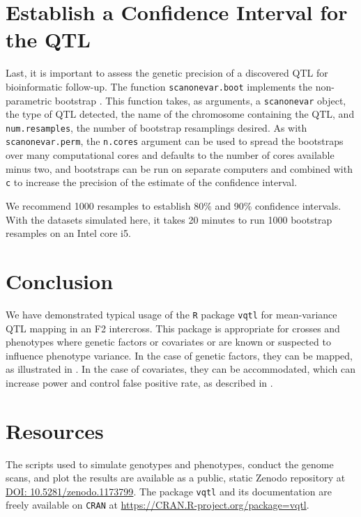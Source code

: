 \documentclass[9pt,twocolumn,twoside]{gsag3jnl}
\begin{document}
\section{Establish a Confidence Interval for the QTL}

Last, it is important to assess the genetic precision of a discovered QTL for bioinformatic follow-up.
The function \texttt{scanonevar.boot} implements the non-parametric bootstrap \citep{Visscher1996}.
This function takes, as arguments, a \texttt{scanonevar} object, the type of QTL detected, the name of the chromosome containing the QTL, and \texttt{num.resamples}, the number of bootstrap resamplings desired.
As with \texttt{scanonevar.perm}, the \texttt{n.cores} argument can be used to spread the bootstraps over many computational cores and defaults to the number of cores available minus two, and bootstraps can be run on separate computers and combined with \texttt{c} to increase the precision of the estimate of the confidence interval.

We recommend 1000 resamples to establish 80\% and 90\% confidence intervals.
With the datasets simulated here, it takes 20 minutes to run 1000 bootstrap resamples on an Intel core i5.







\section*{Conclusion}

We have demonstrated typical usage of the \texttt{R} package \texttt{vqtl} for mean-variance QTL mapping in an F2 intercross.
This package is appropriate for crosses and phenotypes where genetic factors or covariates or are known or suspected to influence phenotype variance.
In the case of genetic factors, they can be mapped, as illustrated in \CortyReanalysisPaper.
In the case of covariates, they can be accommodated, which can increase power and control false positive rate, as described in \CortyMethodsPaper.

\section*{Resources}
The scripts used to simulate genotypes and phenotypes, conduct the genome scans, and plot the results are available as a public, static Zenodo repository at \url{DOI: 10.5281/zenodo.1173799}.
The package \texttt{vqtl} and its documentation are freely available on \texttt{CRAN} at \url{https://CRAN.R-project.org/package=vqtl}.
\end{document}
